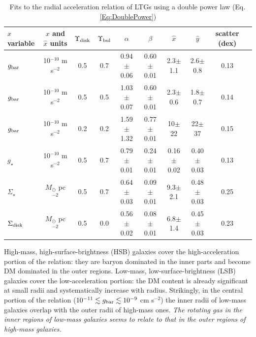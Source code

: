 \documentclass[apjl, twocolappendix]{emulateapj}
\begin{document}
\begin{table}
\begin{center}
\caption{Fits to the radial acceleration relation of LTGs using a double power law (Eq.\,\ref{Eq:DoublePower})}
\begin{tabular}{lccccccccc}
\hline
\hline
$x$ variable & $x$ and $\hat{x}$ units & $\Upsilon_{\rm disk}$ & $\Upsilon_{\rm bul}$ & $\alpha$ & $\beta$ & $\hat{x}$ & $\hat{y}$ & scatter (dex) \\
\hline
$g_{\rm bar}$      & 10$^{-10}$ m s$^{-2}$ & 0.5 & 0.7 & 0.94$\pm$0.06 & 0.60$\pm$0.01 & 2.3$\pm$1.1   & 2.6$\pm$0.8   & 0.13 \\
$g_{\rm bar}$      & 10$^{-10}$ m s$^{-2}$ & 0.5 & 0.5 & 1.03$\pm$0.07 & 0.60$\pm$0.01 & 2.3$\pm$0.6   & 1.8$\pm$0.7   & 0.14 \\
$g_{\rm bar}$      & 10$^{-10}$ m s$^{-2}$ & 0.2 & 0.2 & 1.59$\pm$1.32 & 0.77$\pm$0.01 & 10$\pm$22     & 22$\pm$37     & 0.15 \\
$g_{\star}$        & 10$^{-10}$ m s$^{-2}$ & 0.5 & 0.7 & 0.79$\pm$0.01 & 0.24$\pm$0.01 & 0.16$\pm$0.02 & 0.40$\pm$0.03 & 0.13 \\
$\Sigma_{\star}$   & $M_{\odot}$ pc$^{-2}$ & 0.5 & 0.7 & 0.64$\pm$0.03 & 0.09$\pm$0.01 & 9.3$\pm$2.1   & 0.48$\pm$0.03 & 0.25 \\
$\Sigma_{\rm disk}$& $M_{\odot}$ pc$^{-2}$ & 0.5 & 0.0 & 0.56$\pm$0.02 & 0.08$\pm$0.01 & 6.8$\pm$1.4   & 0.45$\pm$0.03 & 0.23 \\
\hline
\end{tabular}
\label{tab:Fit}
\end{center}
\end{table}

High-mass, high-surface-brightness (HSB) galaxies cover the high-acceleration portion of the relation: they are baryon dominated in the inner parts and become DM dominated in the outer regions. Low-mass, low-surface-brightness (LSB) galaxies cover the low-acceleration portion: the DM content is already significant at small radii and systematically increase with radius. Strikingly, in the central portion of the relation ($10^{-11} \lesssim g_{\rm bar} \lesssim 10^{-9}$ cm s$^{-2}$) the inner radii of low-mass galaxies overlap with the outer radii of high-mass ones. \textit{The rotating gas in the inner regions of low-mass galaxies seems to relate to that in the outer regions of high-mass galaxies.}
\end{document}
